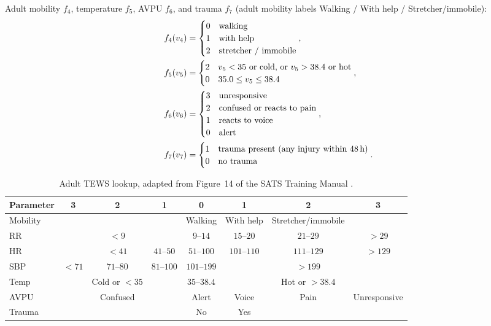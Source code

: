 Adult mobility \(f_4\), temperature \(f_5\), AVPU \(f_6\), and trauma \(f_7\) (adult mobility labels Walking / With help / Stretcher/immobile):
\begin{align}
  f_4(v_{4}) &=
  \begin{cases}
    0 & \text{walking} \\
    1 & \text{with help} \\
    2 & \text{stretcher / immobile}
  \end{cases},
  \\
  f_5(v_{5}) &=
  \begin{cases}
    2 & v_{5} < 35 \text{ or cold, or } v_{5} > 38.4 \text{ or hot} \\
    0 & 35.0 \leq v_{5} \leq 38.4
  \end{cases},
  \\
  f_6(v_{6}) &=
  \begin{cases}
    3 & \text{unresponsive} \\
    2 & \text{confused or reacts to pain} \\
    1 & \text{reacts to voice} \\
    0 & \text{alert}
  \end{cases},
  \\
  f_7(v_{7}) &=
  \begin{cases}
    1 & \text{trauma present (any injury within 48\,h)} \\
    0 & \text{no trauma}
  \end{cases}.
\end{align}

\begin{table}[H]
\centering
\footnotesize
\setlength{\tabcolsep}{3.5pt}
\begin{tabular}{|l|c|c|c|c|c|c|c|}
\hline
\textbf{Parameter} & \textbf{3} & \textbf{2} & \textbf{1} & \textbf{0} & \textbf{1} & \textbf{2} & \textbf{3} \\
\hline
Mobility & & & & Walking & With help & Stretcher/immobile & \\
RR & & $<9$ & & $9$--$14$ & $15$--$20$ & $21$--$29$ & $>29$ \\
HR & & $<41$ & $41$--$50$ & $51$--$100$ & $101$--$110$ & $111$--$129$ & $>129$ \\
SBP & $<71$ & $71$--$80$ & $81$--$100$ & $101$--$199$ & & $>199$ & \\
Temp & & Cold or $<35$ & & $35$--$38.4$ & & Hot or $>38.4$ & \\
AVPU & & Confused & & Alert & Voice & Pain & Unresponsive \\
Trauma & & & & No & Yes & & \\
\hline
\end{tabular}
\caption{Adult TEWS lookup, adapted from Figure~14 of the SATS Training Manual \citep{satsmanual}.}
\label{tab:adult-tews-chart}
\end{table}


